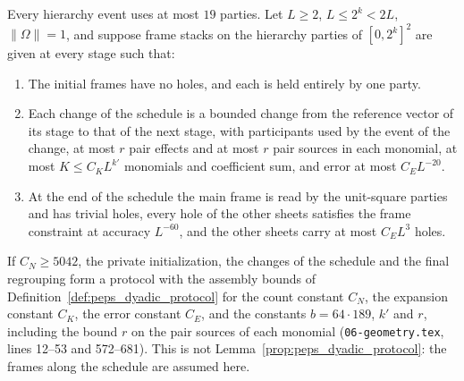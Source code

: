 \begin{lemma}
    \label{thm:peps_protocol_from_bounded_trajectory}
    \leanok
    Every hierarchy event uses at most $19$ parties. Let $L\ge2$, $L\le2^k<2L$, $\lVert\Omega\rVert=1$, and suppose frame stacks on the hierarchy parties of $[0,2^k]^2$ are given at every stage such that:
    \begin{enumerate}
        \item The initial frames have no holes, and each is held entirely by one
              party.
        \item Each change of the schedule is a bounded change from the reference
              vector of its stage to that of the next stage, with participants
              used by the event of the change, at most $r$ pair effects and at most
              $r$ pair sources in each monomial, at most $K\le C_KL^{k'}$ monomials
              and coefficient sum, and error at most $C_EL^{-20}$.
        \item At the end of the schedule the main frame is read by the unit-square
              parties and has trivial holes, every hole of the other sheets
              satisfies the frame constraint at accuracy $L^{-60}$, and the other
              sheets carry at most $C_EL^3$ holes.
    \end{enumerate}
    If $C_N\ge5042$, the private initialization, the changes of the schedule and the
    final regrouping form a protocol with the assembly bounds of
    Definition~\ref{def:peps_dyadic_protocol} for the count constant $C_N$, the
    expansion constant $C_K$, the error constant $C_E$, and the constants
    $b=64\cdot189$, $k'$ and $r$, including the bound $r$ on the pair sources
    of each monomial (\texttt{06-geometry.tex}, lines 12--53 and 572--681). This is not
    Lemma~\ref{prop:peps_dyadic_protocol}: the frames along the schedule are
    assumed here.
\end{lemma}

